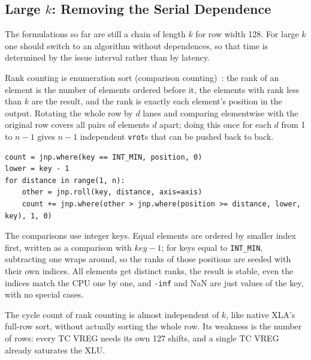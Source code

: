 \documentclass[sigconf,nonacm,balance=false]{acmart}
\newcommand{\code}[1]{\texttt{#1}}
\begin{document}
\subsection{\texorpdfstring{Large $k$: Removing the Serial Dependence}{Large k: Removing the Serial Dependence}}
\label{sec:5.3}

The formulations so far are still a chain of length $k$ for row width 128. For large $k$ one should switch to an algorithm without dependences, so that time is determined by the issue interval rather than by latency.

Rank counting is enumeration sort (comparison counting)~\cite{knuth1998}: the rank of an element is the number of elements ordered before it, the elements with rank less than $k$ are the result, and the rank is exactly each element's position in the output. Rotating the whole row by $d$ lanes and comparing elementwise with the original row covers all pairs of elements $d$ apart; doing this once for each $d$ from 1 to $n - 1$ gives $n - 1$ independent \code{vrot}s that can be pushed back to back.

\begin{lstlisting}
count = jnp.where(key == INT_MIN, position, 0)
lower = key - 1
for distance in range(1, n):
    other = jnp.roll(key, distance, axis=axis)
    count += jnp.where(other > jnp.where(position >= distance, lower, key), 1, 0)
\end{lstlisting}
The comparisons use integer keys. Equal elements are ordered by smaller index first, written as a comparison with $\mathit{key} - 1$; for keys equal to \code{INT\_\allowbreak{}MIN}, subtracting one wraps around, so the ranks of those positions are seeded with their own indices. All elements get distinct ranks, the result is stable, even the indices match the CPU one by one, and \code{-inf} and NaN are just values of the key, with no special cases.

The cycle count of rank counting is almost independent of $k$, like native XLA's full-row sort, without actually sorting the whole row. Its weakness is the number of rows: every TC VREG needs its own 127 shifts, and a single TC VREG already saturates the XLU.
\end{document}

